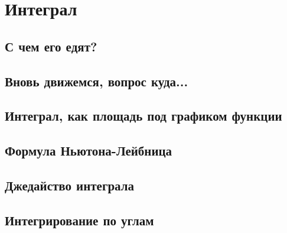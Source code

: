 \section{Интеграл}
\subsection{С чем его едят?}
\subsection{Вновь движемся, вопрос куда...}
\subsection{Интеграл, как площадь под графиком функции}
\subsection{Формула Ньютона-Лейбница}
\subsection{Джедайство интеграла}
\subsection{Интегрирование по углам}